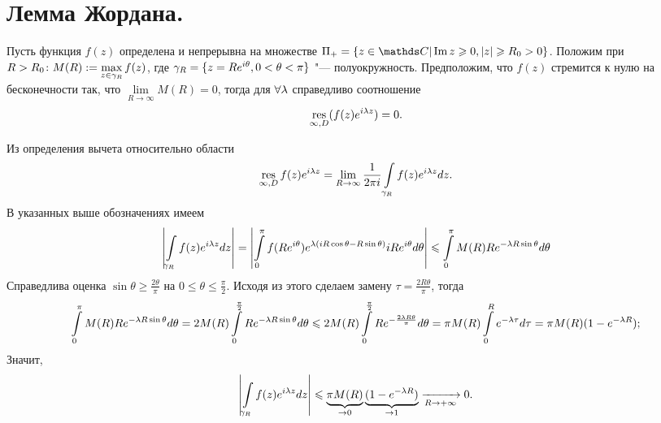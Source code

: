 \newpage
\section{Лемма Жордана.}

\begin{Lem}
Пусть функция $f(z)$ определена и непрерывна на множестве $\Pi_{+} = \{z \in \C| \Im z \ge 0, |z| \ge R_0 > 0\}$.
Положим при $R > R_0 \colon M(R) := \max\limits_{z \in \gamma_R} f(z)$, где $\gamma_R = \{z = R e^{i\theta}, 0<\theta<\pi \}$  "--- полуокружность. 
Предположим, что $f(z)$ стремится к нулю на бесконечности так, что $\lim\limits_{R \to \infty} M(R) = 0$, тогда для $\forall \lambda$ справедливо соотношение
\[
\mathop{\rm res}\limits\limits_{\infty, D}(f(z)e^{i \lambda z}) = 0.
\]
\end{Lem}

\begin{Proof}
Из определения вычета относительно области  
\[\mathop{\rm res}\limits\limits_{\infty,D} f(z)e^{i \lambda z} = \lim\limits_{R \rightarrow \infty} \frac{1}{2\pi i} \int\limits_{\gamma_{R}} f(z)e^{i \lambda z}dz.
\]
В указанных выше обозначениях имеем 
\[
\left|\int\limits_{\gamma_{R}} f(z)e^{i \lambda z} dz\right| = \left|\int\limits_{0}^{\pi} f(R e^{i\theta})e^{\lambda(i R \cos{\theta} - R \sin{\theta})} i R e^{i\theta}d\theta\right| \leqslant 
\int\limits_{0}^{\pi} M(R)  R e^{- \lambda R \sin{\theta}}d\theta
\]
Справедлива оценка $\sin{\theta} \ge \frac{2 \theta}{\pi}$ на $0 \le \theta \le \frac{\pi}{2}$. 
Исходя из этого сделаем замену $\tau = \frac{2R\theta}{\pi}$, тогда
\[
\int\limits_{0}^{\pi} M(R)  R e^{- \lambda R \sin{\theta}}d\theta = 2 M(R) \int\limits_{0}^{\frac{\pi}{2}}  R e^{- \lambda R \sin{\theta}}d\theta \leqslant 2 M(R) \int\limits_{0}^{\frac{\pi}{2}} R e^{-  \frac{2 \lambda R \theta}{\pi}}d\theta =  \pi M(R) \int\limits_{0}^{R}  e^{-  \lambda\tau}d\tau = \pi M(R) (1-e^{-\lambda R});
\]
Значит,
\[
\left|\int\limits_{\gamma_{R}} f(z)e^{i \lambda z} dz\right| \leqslant  \underbrace{\pi M(R)}_{\rightarrow 0} \underbrace{(1-e^{-\lambda R})}_{\rightarrow 1} \xrightarrow[R\rightarrow+\infty]{} 0.
\]

\end{Proof}